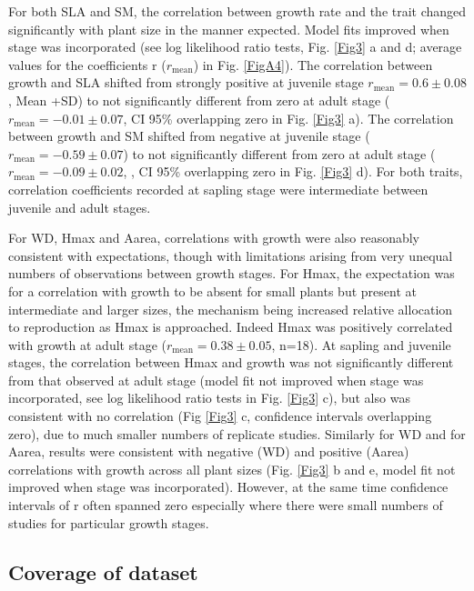 \documentclass[a4paper]{article}\usepackage[]{graphicx}\usepackage[]{color}
\begin{document}
For both SLA and SM, the correlation between growth rate and the trait changed significantly with plant size in the manner expected. Model fits improved when stage was incorporated (see log likelihood ratio tests, Fig. \ref{Fig3} a and d; average values for the coefficients r ($r_{\textrm{mean}}$) in Fig. \ref{FigA4}). The correlation between growth and SLA shifted from strongly positive at juvenile stage $r_{\textrm{mean}}=0.6 \pm 0.08$, Mean +SD) to not significantly different from zero at adult stage ($r_{\textrm{mean}}= -0.01 \pm 0.07$, CI 95\% overlapping zero in Fig. \ref{Fig3} a). The correlation between growth and SM shifted from negative at juvenile stage ($r_{\textrm{mean}}= -0.59 \pm 0.07$) to not significantly different from zero at adult stage ($r_{\textrm{mean}}= -0.09 \pm 0.02$, , CI 95\% overlapping zero in Fig. \ref{Fig3} d). For both traits, correlation coefficients recorded at sapling stage were intermediate between juvenile and adult stages. 

For WD, Hmax and Aarea, correlations with growth were also reasonably consistent with expectations, though with limitations arising from very unequal numbers of observations between growth stages. For Hmax, the expectation was for a correlation with growth to be absent for small plants but present at intermediate and larger sizes, the mechanism being increased relative allocation to reproduction as Hmax is approached. Indeed Hmax was positively correlated with growth at adult stage ($r_{\textrm{mean}}= 0.38 \pm 0.05$, n=18). At sapling and juvenile stages, the correlation between Hmax and growth was not significantly different from that observed at adult stage (model fit not improved when stage was incorporated, see log likelihood ratio tests in Fig. \ref{Fig3} c), but also was consistent with no correlation (Fig \ref{Fig3} c, confidence intervals overlapping zero), due to much smaller numbers of replicate studies. Similarly for WD and for Aarea, results were consistent with negative (WD) and positive (Aarea) correlations with growth across all plant sizes (Fig. \ref{Fig3} b and e, model fit not improved when stage was incorporated). However, at the same time confidence intervals of r often spanned zero especially where there were small numbers of studies for particular growth stages. 

\subsection*{Coverage of dataset}
\end{document}
